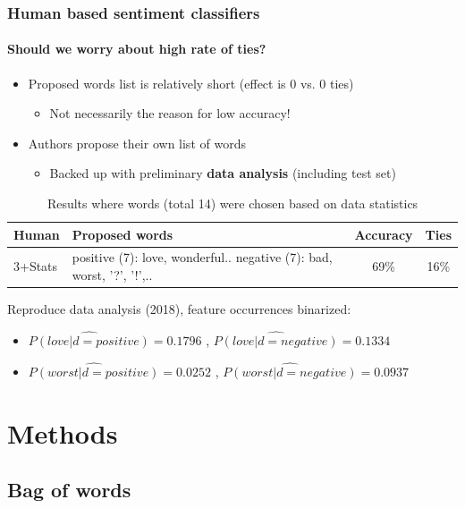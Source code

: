 \documentclass{beamer}
\begin{document}
\begin{frame}
	\frametitle{Human based sentiment classifiers}
	\framesubtitle{Should we worry about high rate of ties?}
	\begin{itemize}
		\item Proposed words list is relatively short (effect is 0 vs. 0 ties)
		\pause
		\begin{itemize}
			\item Not necessarily the reason for low accuracy!
		\end{itemize}
		\pause
		\item Authors propose their own list of words
		\begin{itemize}
			\item Backed up with preliminary \textbf{data analysis} (including test set)
		\end{itemize}
	\end{itemize}
	
	
	\pause
	\begin{table}
		\scriptsize
		\begin{tabular}{ l | p{5cm} | c | c }
			Human & Proposed words & Accuracy & Ties \\ \hline \hline
			3+Stats & positive (7): love, wonderful.. \newline negative (7): bad, worst, '?', '!',.. & 69\% & 16\% \\ \hline
		\end{tabular}
		\caption{Results where words (total 14) were chosen based on data statistics}
	\end{table}
	
	\pause
	Reproduce data analysis (2018), feature occurrences binarized:
	\begin{itemize}
		\small
		\item $\widehat{P(love|d=positive)} = 0.1796$ , $\widehat{P(love|d=negative)} = 0.1334$ \pause
		\item $\widehat{P(worst|d=positive)} = 0.0252$ , $\widehat{P(worst|d=negative)} = 0.0937$
	\end{itemize}
\end{frame}

\section{Methods}
\subsection{Bag of words}
\end{document}
